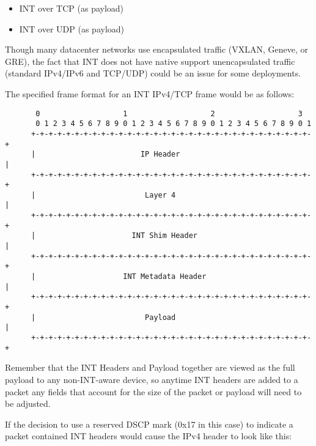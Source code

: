 \documentclass[letterpaper,twocolumn,10pt]{article}
\begin{document}
\begin{itemize}
\item INT over TCP (as payload)
\item INT over UDP (as payload)
\end{itemize}

Though many datacenter networks use encapsulated traffic (VXLAN, Geneve,
or GRE), the fact that INT does not have native support unencapsulated
traffic (standard IPv4/IPv6 and TCP/UDP) could be an issue for some
deployments.

The specified frame format for an INT IPv4/TCP frame would be as follows:

\begin{center}
\tiny
\begin{verbatim}
       0                   1                   2                   3
       0 1 2 3 4 5 6 7 8 9 0 1 2 3 4 5 6 7 8 9 0 1 2 3 4 5 6 7 8 9 0 1
      +-+-+-+-+-+-+-+-+-+-+-+-+-+-+-+-+-+-+-+-+-+-+-+-+-+-+-+-+-+-+-+-+
      |                        IP Header                              |
      +-+-+-+-+-+-+-+-+-+-+-+-+-+-+-+-+-+-+-+-+-+-+-+-+-+-+-+-+-+-+-+-+
      |                         Layer 4                               |
      +-+-+-+-+-+-+-+-+-+-+-+-+-+-+-+-+-+-+-+-+-+-+-+-+-+-+-+-+-+-+-+-+
      |                      INT Shim Header                          |
      +-+-+-+-+-+-+-+-+-+-+-+-+-+-+-+-+-+-+-+-+-+-+-+-+-+-+-+-+-+-+-+-+
      |                    INT Metadata Header                        |
      +-+-+-+-+-+-+-+-+-+-+-+-+-+-+-+-+-+-+-+-+-+-+-+-+-+-+-+-+-+-+-+-+
      |                         Payload                               |
      +-+-+-+-+-+-+-+-+-+-+-+-+-+-+-+-+-+-+-+-+-+-+-+-+-+-+-+-+-+-+-+-+
\end{verbatim}
\normalsize
\end{center}

Remember that the INT Headers and Payload together are viewed as the full
payload to any non-INT-aware device, so anytime INT headers are added to
a packet any fields that account for the size of the packet or
payload will need to be adjusted.

If the decision to use a reserved DSCP mark (0x17 in this case) to
indicate a packet contained INT headers would cause the IPv4 header to
look like this:
\end{document}
